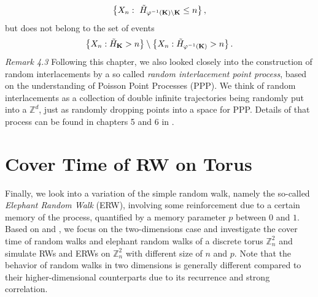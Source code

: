 \documentclass[
11pt, %
a4paper, %
oneside, %
headinclude,footinclude, %
BCOR5mm, %
]{scrartcl}
\begin{document}
\begin{equation}
    \left\{X_n: \ \Tilde{H}_{\varphi^{-1}(\mathbf{K})\setminus \mathbf{K}} \leq n\right\}, \notag
\end{equation}
but does not belong to the set of events 
\begin{equation}
    \left\{X_n: \Tilde{H}_{\mathbf{K} } >n\right\} \setminus \left\{X_n: \Tilde{H}_{\varphi^{-1}(\mathbf{K})}>n \right\}. \notag
\end{equation}
\textit{Remark 4.3} Following this chapter, we also looked closely into the construction of random interlacements by a so called \textit{random interlacement point process}, based on the understanding of Poisson Point Processes (PPP). We think of random interlacements as a collection of double infinite trajectories being randomly put into a $\mathbb{Z}^d$, just as randomly dropping points into a space for PPP. Details of that process can be found in chapters 5 and 6 in \cite{drewitz2014introduction}.

\section{Cover Time of RW on Torus}
Finally, we look into a variation of the simple random walk, namely the so-called \textit{Elephant Random Walk} (ERW), involving some reinforcement due to a certain memory of the process, quantified by a memory parameter $p$ between $0$ and $1$. Based on \cite{comets2013large} and \cite{bercu2019multi}, we focus on the two-dimensions case and investigate the cover time of random walks and elephant random walks of a discrete torus $\mathbb{Z}_n^2$ and simulate RWs and ERWs on $\mathbb{Z}_n^2$ with different size of $n$ and $p$. Note that the behavior of random walks in two dimensions is generally different compared to their higher-dimensional counterparts due to its recurrence and strong correlation.
\end{document}
